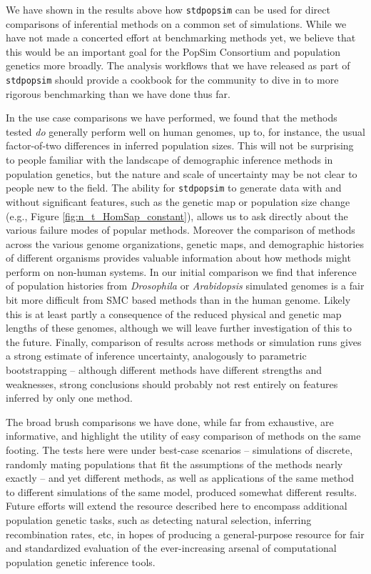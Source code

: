 \documentclass[12pt,halfline,a4paper]{ouparticle}
\newcommand{\stdpopsim}{\texttt{stdpopsim}\xspace}
\begin{document}
We have shown in the results above how \stdpopsim can be used for direct comparisons
of inferential methods on a common set of simulations. While we have not made a concerted
effort at benchmarking methods yet, we believe that this would be an important goal for
the PopSim Consortium and population genetics more broadly. The analysis workflows that
we have released as part of \stdpopsim should provide a cookbook for the community to
dive in to more rigorous benchmarking than we have done thus far.

In the use case comparisons we have performed,
we found that the methods tested \emph{do} generally perform well on human genomes,
up to, for instance, the usual factor-of-two differences in inferred population sizes.
This will not be surprising to people familiar with the landscape of
demographic inference methods in population genetics,
but the nature and scale of uncertainty may be not clear to people new to the field.
The ability for \stdpopsim to generate data with and without significant features, such
as the genetic map or population size change (e.g., Figure \ref{fig:n_t_HomSap_constant}), allows
us to ask directly about the various failure modes of popular methods.
Moreover the comparison of methods across the various genome organizations, genetic maps,
and demographic histories of different organisms provides valuable information
about how methods might perform on non-human systems.
In our initial comparison we find that inference of population histories from \emph{Drosophila}
or \emph{Arabidopsis} simulated genomes is a fair bit more difficult from SMC based methods
than in the human genome. Likely this is at least partly a consequence of the reduced physical and genetic
map lengths of these genomes, although we will leave further investigation of this to the future.
Finally, comparison of results across methods or simulation runs
gives a strong estimate of inference uncertainty, analogously to parametric bootstrapping --
although different methods have different strengths and weaknesses,
strong conclusions should probably not rest entirely on features inferred by only one method.

The broad brush comparisons we have done, while far from exhaustive, are informative,
and highlight the utility of easy comparison of methods on the same footing.
The tests here were under best-case scenarios --
simulations of discrete, randomly mating populations that fit the assumptions of the methods nearly exactly --
and yet different methods, as well as applications of the same method
to different simulations of the same model,
produced somewhat different results. Future efforts will extend the resource described here to
encompass additional population genetic tasks, such as detecting natural selection, inferring
recombination rates, etc, in hopes of producing a general-purpose resource for fair and
standardized evaluation of the ever-increasing arsenal of computational population genetic
inference tools.
\end{document}
